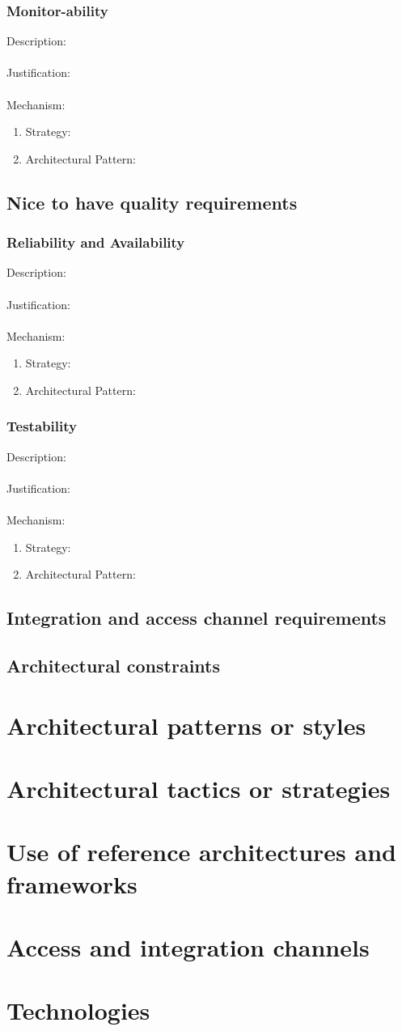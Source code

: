 \documentclass[a4paper,12pt,titlepage]{article}
\begin{document}
\subsubsection{Monitor-ability}%
	Description: \\\\
	Justification: \\\\
	Mechanism:
	\begin{enumerate}
		\item Strategy: 
		\item Architectural Pattern:
	\end{enumerate}
\newpage
\subsection{Nice to have quality requirements}
\subsubsection{Reliability and Availability}%
	Description: \\\\
	Justification: \\\\
	Mechanism:
	\begin{enumerate}
		\item Strategy: 
		\item Architectural Pattern:
	\end{enumerate}
\subsubsection{Testability}%
	Description: \\\\
	Justification: \\\\
	Mechanism:
	\begin{enumerate}
		\item Strategy: 
		\item Architectural Pattern:
	\end{enumerate}
\newpage
\subsection{Integration and access channel requirements}
\newpage
\subsection{Architectural constraints}
\newpage
\section{Architectural patterns or styles}
\newpage
\section{Architectural tactics or strategies}
\newpage
\section{Use of reference architectures and frameworks}
\newpage
\section{Access and integration channels}
\newpage
\section{Technologies}
\end{document}
